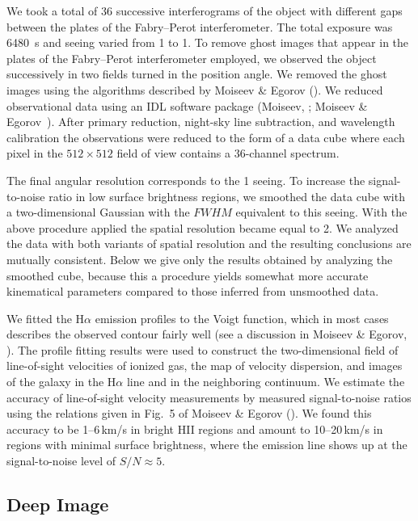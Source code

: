 \documentclass{ab}
\newcommand{\km}{\,\mbox{km/s}}
\begin{document}
We took a total of 36 successive interferograms of the object with
different gaps between the plates of the Fabry--Perot
interferometer. The total exposure was 6480~s and seeing varied
from  1 to 1. To remove ghost images that appear in
the plates of the Fabry--Perot interferometer employed, we
observed the object successively in two fields   turned in the position angle. We removed the ghost images
using the algorithms described by Moiseev \& Egorov (\cite{mois08:Moiseev_n}). We reduced observational data using an IDL software package (Moiseev, \cite{mois02:Moiseev_n}; Moiseev \& Egorov~\cite{mois08:Moiseev_n}). After primary reduction, night-sky line subtraction, and wavelength calibration the
observations were reduced to the form of a data cube where each
pixel in the $512\times512$ field of view contains a 36-channel
spectrum.

The final angular resolution corresponds to the  1 seeing.
To increase the signal-to-noise ratio in low surface brightness
regions, we smoothed the data cube with a two-dimensional Gaussian
with the $FWHM$ equivalent to this seeing. With the above
procedure applied the spatial resolution became equal to 2.
We analyzed the data with both variants of spatial resolution  and
the resulting conclusions are mutually consistent. Below we give
only the results obtained by analyzing the smoothed cube, because
this a procedure yields somewhat more accurate kinematical
parameters compared to those inferred from unsmoothed data.

We fitted the  H$\alpha$ emission profiles to the Voigt function,
which in most cases describes the observed contour fairly well
(see a discussion in Moiseev \& Egorov, \cite{mois08:Moiseev_n}). The profile fitting results were used  to construct the two-dimensional
field of line-of-sight velocities of ionized gas, the map of
velocity dispersion, and images of the galaxy in the H$\alpha$
line and in the neighboring continuum. We estimate the accuracy of
line-of-sight velocity measurements by measured signal-to-noise
ratios using the relations given in Fig.~5 of Moiseev \& Egorov (\cite{mois08:Moiseev_n}). We found this accuracy to be
\mbox{1--6\km} in bright HII regions and amount to
\mbox{10--20\km} in regions with minimal surface brightness, where
the emission line shows up at the signal-to-noise level of
$S/N\approx5$.

\subsection{Deep Image}
\end{document}
